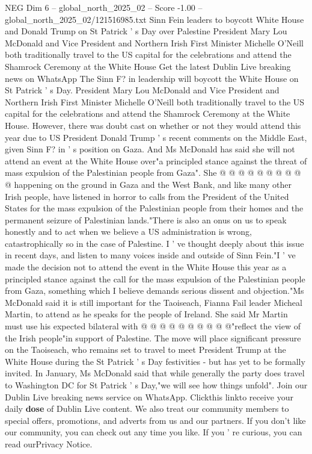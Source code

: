 \begin{textsample}{NEG Dim 6 – global\_north\_2025\_02 – Score -1.00 – global\_north\_2025\_02/121516985.txt}  \label{ex:f6_neg_078}
Sinn Fein leaders to boycott White House and Donald Trump on St Patrick ' s Day over Palestine President Mary Lou McDonald and Vice President and Northern Irish First Minister Michelle O'Neill both traditionally travel to the US capital for the celebrations and attend the Shamrock Ceremony at the White House Get the latest Dublin Live breaking news on WhatsApp The Sinn F? in leadership will boycott the White House on St Patrick ' s Day.
President Mary Lou McDonald and Vice President and Northern Irish First Minister Michelle O'Neill both traditionally travel to the US capital for the celebrations and attend the Shamrock Ceremony at the White House.
However, there was doubt cast on whether or not they would attend this year due to US President Donald Trump ' s recent comments on the Middle East, given Sinn F? in ' s position on Gaza.
And Ms McDonald has said she will not attend an event at the White House over"a principled stance against the threat of mass expulsion of the Palestinian people from Gaza".
She @ @ @ @ @ @ @ @ @ @ happening on the ground in Gaza and the West Bank, and like many other Irish people, have listened in horror to calls from the President of the United States for the mass expulsion of the Palestinian people from their homes and the permanent seizure of Palestinian lands."There is also an onus on us to speak honestly and to act when we believe a US administration is wrong, catastrophically so in the case of Palestine.
I ' ve thought deeply about this issue in recent days, and listen to many voices inside and outside of Sinn Fein."I ' ve made the decision not to attend the event in the White House this year as a principled stance against the call for the mass expulsion of the Palestinian people from Gaza, something which I believe demands serious dissent and objection."Ms McDonald said it is still important for the Taoiseach, Fianna Fail leader Micheal Martin, to attend as he speaks for the people of Ireland.
She said Mr Martin must use his expected bilateral with @ @ @ @ @ @ @ @ @ @"reflect the view of the Irish people"in support of Palestine.
The move will place significant pressure on the Taoiseach, who remains set to travel to meet President Trump at the White House during the St Patrick ' s Day festivities - but has yet to be formally invited.
In January, Ms McDonald said that while generally the party does travel to Washington DC for St Patrick ' s Day,"we will see how things unfold".
Join our Dublin Live breaking news service on WhatsApp.
Clickthis linkto receive your daily \textbf{dose} of Dublin Live content.
We also treat our community members to special offers, promotions, and adverts from us and our partners.
If you don't like our community, you can check out any time you like.
If you ' re curious, you can read ourPrivacy Notice.

\end{textsample}
